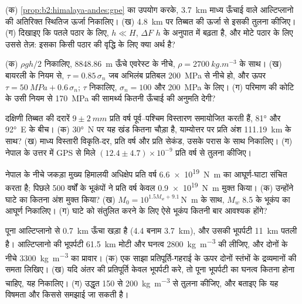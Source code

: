 \begin{exercise}[$\star\star$]\label{exo:b2:himalaya-andes:6}
(क) \cref{prop:b2:himalaya-andes:gpe} का उपयोग करके, \qty{3.7}{km} माध्य ऊँचाई वाले
आल्टिप्लानो की अतिरिक्त स्थितिज ऊर्जा निकालिए। (ख) \qty{4.8}{km} पर तिब्बत की ऊर्जा से इसकी तुलना कीजिए।
(ग) दिखाइए कि पतले पठार के लिए, $h \ll H$, $\Delta F$ $h$ के अनुपात में बढ़ता है, और
मोटे पठार के लिए उससे तेज़: इसका किसी पठार की वृद्धि के लिए क्या अर्थ है?
\end{exercise}

\begin{exercise}[$\star\star$]\label{exo:b2:himalaya-andes:7}
(क) $\rho g h/2$ निकालिए, \qty{8848.86}{m} ऊँचे एवरेस्ट के नीचे, $\rho =
\qty{2700}{kg.m^{-3}}$ के साथ। (ख) बायरली के नियम से, $\tau = 0.85\,\sigma_n$ जब अभिलंब प्रतिबल \qty{200}{MPa} से
नीचे हो, और ऊपर $\tau = \qty{50}{MPa} + 0.6\,\sigma_n$; $\tau$ निकालिए, $\sigma_n =
100$ और \qty{200}{MPa} के लिए। (ग) परिमाण की कोटि के उसी नियम से \qty{170}{MPa} की
सामर्थ्य कितनी ऊँचाई की अनुमति देगी?
\end{exercise}

\begin{exercise}[$\star\star$]\label{exo:b2:himalaya-andes:8}
दक्षिणी तिब्बत की दरारें $9 \pm \qty{2}{mm}$ प्रति वर्ष पूर्व--पश्चिम विस्तारण समायोजित करती हैं,
\ang{81} और \ang{92}~E के बीच। (क) \ang{30}~N पर यह खंड कितना चौड़ा है, याम्योत्तर पर प्रति अंश \qty{111.19}{km}
के साथ? (ख) माध्य विस्तारी विकृति-दर, प्रति वर्ष और प्रति सेकंड,
उसके परास के साथ निकालिए। (ग) नेपाल के उत्तर में GPS से मिले $(12.4 \pm 4.7) \times 10^{-9}$ प्रति वर्ष से तुलना कीजिए।
\end{exercise}

\begin{exercise}[$\star\star$]\label{exo:b2:himalaya-andes:9}
नेपाल के नीचे जकड़ा मुख्य हिमालयी अधिक्षेप प्रति वर्ष
\qty{6.6e19}{N.m} का आघूर्ण-घाटा संचित करता है; पिछले 500 वर्षों के भूकंपों ने प्रति वर्ष केवल
\qty{0.9e19}{N.m} मुक्त किया। (क) उन्होंने घाटे का कितना अंश मुक्त किया? (ख) $M_0 =
10^{1.5 M_w + 9.1}$\,\unit{N.m} के साथ, $M_w$ 8.5 के भूकंप का आघूर्ण निकालिए। (ग) घाटे को संतुलित करने के लिए
ऐसे भूकंप कितनी बार आवश्यक होंगे?
\end{exercise}

\begin{exercise}[$\star\star\star$]\label{exo:b2:himalaya-andes:10}
पूना आल्टिप्लानो से \qty{0.7}{km} ऊँचा खड़ा है (4.4 बनाम \qty{3.7}{km}), और उसकी भूपर्पटी
\qty{11}{km} पतली है। आल्टिप्लानो की भूपर्पटी \qty{61.5}{km} मोटी और घनत्व
\qty{2800}{kg.m^{-3}} की लीजिए, और दोनों के नीचे \qty{3300}{kg.m^{-3}} का प्रावार। (क) एक साझा प्रतिपूर्ति-गहराई
के ऊपर दोनों स्तंभों के द्रव्यमानों की समता लिखिए। (ख) यदि अंतर की प्रतिपूर्ति केवल भूपर्पटी करे, तो
पूना भूपर्पटी का घनत्व कितना होना चाहिए, यह निकालिए। (ग) उद्धृत 150 से \qty{200}{kg.m^{-3}} से
तुलना कीजिए, और बताइए कि यह विषमता और किससे समझाई जा सकती है।
\end{exercise}

